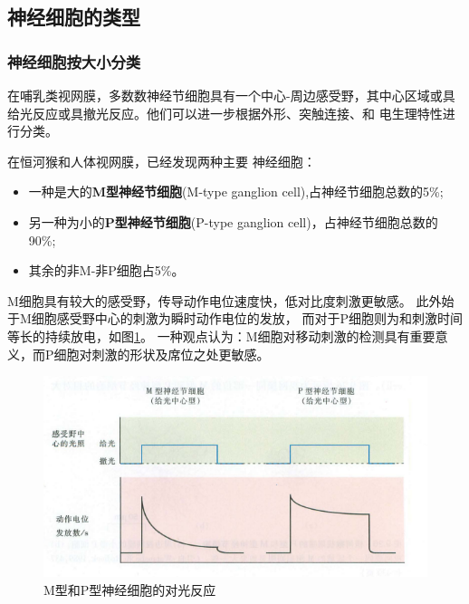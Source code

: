 \subsection{神经细胞的类型}
\begin{frame}
    \frametitle{神经细胞按大小分类}

    在哺乳类视网膜，多数数神经节细胞具有一个中心-周边感受野，其中心区域或具给光反应或具撤光反应。他们可以进一步根据外形、突触连接、和
电生理特性进行分类。

在恒河猴和人体视网膜，已经发现两种主要 神经细胞：
    \scriptsize{
        \begin{itemize}
            \item 一种是大的\textbf{M型神经节细胞}(M-type ganglion cell),占神经节细胞总数的5\%;
            \item 另一种为小的\textbf{P型神经节细胞}(P-type ganglion cell)，占神经节细胞总数的90\%;
            \item 其余的非M-非P细胞占5\%。
        \end{itemize}
    }

    M细胞具有较大的感受野，传导动作电位速度快，低对比度刺激更敏感。
    此外始于M细胞感受野中心的刺激为瞬时动作电位的发放，
    而对于P细胞则为和刺激时间等长的持续放电，如图\ref{pic7-3}。
    一种观点认为：M细胞对移动刺激的检测具有重要意义，而P细胞对刺激的形状及席位之处更敏感。
    \begin{figure}
        \centering
        \includegraphics[height=.3\textheight]{img/pic7-3.png}
        \caption{M型和P型神经细胞的对光反应\label{pic7-3}}
    \end{figure}

\end{frame}
